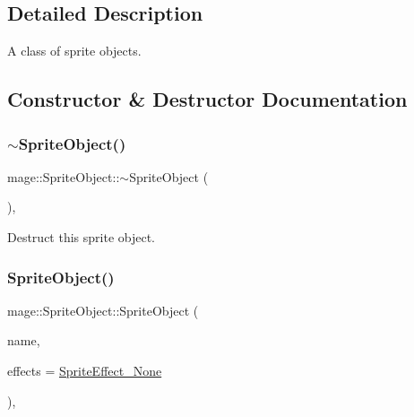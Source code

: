 \subsection{Detailed Description}
A class of sprite objects. 

\subsection{Constructor \& Destructor Documentation}
\hypertarget{classmage_1_1_sprite_object_aad4d1472cb468d8c19b61ab030332ceb}{}\label{classmage_1_1_sprite_object_aad4d1472cb468d8c19b61ab030332ceb} 
\subsubsection{\texorpdfstring{$\sim$\+Sprite\+Object()}{~SpriteObject()}}
{\footnotesize\ttfamily mage\+::\+Sprite\+Object\+::$\sim$\+Sprite\+Object (\begin{DoxyParamCaption}{ }\end{DoxyParamCaption})\hspace{0.3cm}{\ttfamily [virtual]}, {\ttfamily [default]}}

Destruct this sprite object. \hypertarget{classmage_1_1_sprite_object_a1d487cfddfd6e3f60047f9316522ba8b}{}\label{classmage_1_1_sprite_object_a1d487cfddfd6e3f60047f9316522ba8b} 
\subsubsection{\texorpdfstring{Sprite\+Object()}{SpriteObject()}\hspace{0.1cm}{\footnotesize\ttfamily [1/3]}}
{\footnotesize\ttfamily mage\+::\+Sprite\+Object\+::\+Sprite\+Object (\begin{DoxyParamCaption}\item[{const string \&}]{name,  }\item[{\hyperlink{namespacemage_a9cfe18123066ba4236f548f9de75d881}{Sprite\+Effect}}]{effects = {\ttfamily \hyperlink{namespacemage_a9cfe18123066ba4236f548f9de75d881af3c275fbfacfe174da928b2f24dfa515}{Sprite\+Effect\+\_\+\+None}} }\end{DoxyParamCaption})\hspace{0.3cm}{\ttfamily [explicit]}, {\ttfamily [protected]}}

